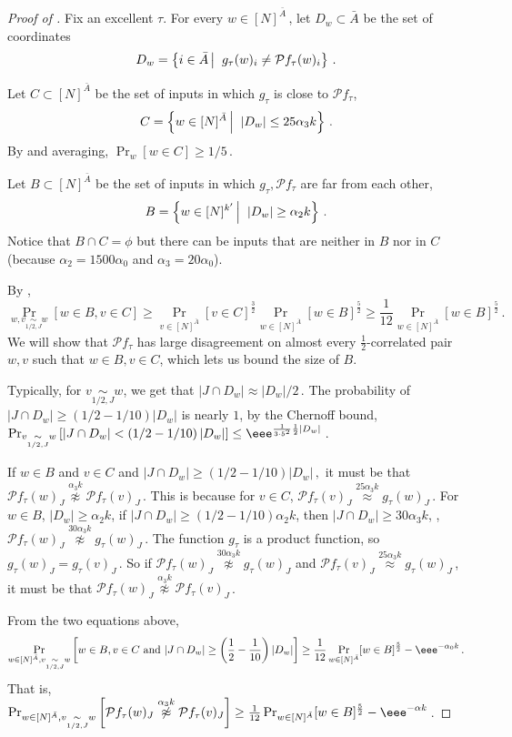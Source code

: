\documentclass{toc}
\newcommand{\Prob}[2][]{\Pr_{{#1}}\left[#2\right]} %
\newcommand{\Paren}[1]{\left(#1\right)} %
\newcommand{\abs}[1]{\lvert#1\rvert} %
\newcommand\sett[2]{\left\{ #1 \left| \; \vphantom{#1 #2} \right. #2  \right\}} %
\newcommand\f{f} %
\newcommand{\g}{g} %
\newcommand\bh{\mathcal{P}\f_\tau} %
\newcommand\neql[1]{\stackrel{{#1}}{ \approx}} %
\newcommand\neqg[1]{\stackrel{{#1}}{ \not\approx}} %
\newcommand\cor[1]{\underset{\scriptscriptstyle#1}{\sim}} %
\begin{document}
\begin{proof}[Proof of ]
	Fix an excellent $\tau$.	
	For every $w\in [N]^{\bar{A}}$\,, let $D_w\subset\bar{A}$ be the set of coordinates %
	\[ D_w = \sett{i\in\bar{A}}{\g_\tau(w)_i\neq\bh(w)_i}\,. \] %
	
	Let $C\subset[N]^{\bar{A}}$ be the set of inputs in which $\g_\tau$ is close to $\bh$,
	\[ C = \sett{w\in[N]^{\bar{A}}}{\abs{D_w}\leq 25\alpha_3 k} \,.\]%
	By  and averaging, $\Pr_w[w\in C]\geq 
	1/5$\,.%
	
	Let $B\subset[N]^{\bar{A}}$ be the set of inputs in which $\g_\tau,\bh$ are far from each other,
	\[ B = \sett{w\in[N]^{k'}}{\abs{D_w}\geq \alpha_2 k} \,.\]%
	Notice that $B\cap C=\phi$ but there can be inputs that are neither in $B$ nor in $C$ (because $\alpha_2 = 1500\alpha_0$ and $\alpha_3 = 20\alpha_0$).
	
	By , 
	\[ \Prob[{w,v\cor{1/2,J}{w}}]{w\in B, v\in C}\geq \Pr_{v\in[N]^{\bar{A}}}[v\in C]^\frac{3}{2}\Pr_{w\in[N]^{\bar{A}}}[w\in B]^\frac{5}{2} \geq \frac{1}{12}\Pr_{w\in[N]^{\bar{A}}}[w\in B]^\frac{5}{2}\,. \]%
	We will show that $\bh$ has large disagreement on almost every $\frac{1}{2}$-correlated pair $w,v$ such that $w\in B,v\in C$, which lets us bound the size of $B$. 
	
	Typically, for $v\cor{1/2,J}w$, we get that $\abs{J\cap D_w}\approx 
\abs{D_w}/2$\,. %
 The probability of  $\abs{J\cap D_w}\geq 
	\Paren{1/2-1/10}\abs{D_w}$ %
	is nearly $1$, by
the   %
Chernoff bound, $\Prob[{v\cor{1/2,J}{w}}]{\abs{J\cap D_w}< 
	\Paren{1/2-1/10}\abs{D_w} %
 } \leq \eee^{\frac{1}{3\cdot 5^2}\frac{1}{2}\abs{D_w}}$\,. 
	
	If $w\in B$ and $v\in C$ and  $\abs{J\cap D_w}\geq 
		\Paren{1/2-1/10}\abs{D_w}\,,$ %
	it must be that $\bh(w)_J\neqg{\alpha_3 k} \bh(v)_J$\,. This is because for $v\in C$, $\bh(v)_J\neql{25\alpha_3 k}\g_\tau(w)_J$\,. For $w\in B$, $\abs{D_w}\geq \alpha_2 k$, if $\abs{J\cap D_w}\geq
	 	\Paren{1/2-1/10} %
	 \alpha_2 k$, then $ \abs{J\cap D_w}\geq 30\alpha_3 k$, \ie, $\bh(w)_J\neqg{30\alpha_3 k}\g_\tau(w)_J$\,. The function $\g_\tau$ is a product function, so $\g_\tau(w)_J = \g_\tau(v)_J$\,. So if $\bh(w)_J\neqg{30\alpha_3 k}\g_\tau(w)_J$ and $\bh(v)_J\neql{25\alpha_3 k}\g_\tau(w)_J$\,, it must be that $\bh(w)_J\neqg{\alpha_3 k} \bh(v)_J$\,.
	 
	 From the two equations above,
	\begin{align} \label{eq:lower BC}
		\Prob[{w\in[N]^{\bar{A}},v\cor{1/2,J}w}]{w\in B,v\in C \textrm{ and } \abs{J\cap D_w}\geq \Paren{\frac{1}{2}-\frac{1}{10}}\abs{D_w}} \geq \frac{1}{12}\Pr_{w\in[N]^{\bar{A}}}[w\in B]^\frac{5}{2} - \eee^{-\alpha_0 k}\,.%
	\end{align}
	That is, $\Prob[{w\in[N]^{\bar{A}},v\cor{1/2,J}w}]{\bh(w)_J\neqg{\alpha_3 k} \bh(v)_J}\geq \frac{1}{12}\Pr_{w\in[N]^{\bar{A}}}[w\in B]^\frac{5}{2} - \eee^{-\alpha k}$\,.


\end{proof}
\end{document}
